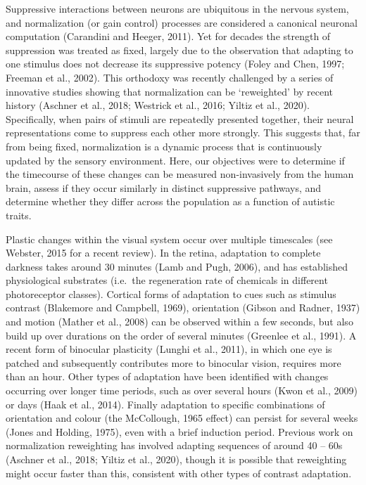 \documentclass[
]{article}
\begin{document}
Suppressive interactions between neurons are ubiquitous in the nervous system, and normalization (or gain control) processes are considered a canonical neuronal computation (Carandini and Heeger, 2011). Yet for decades the strength of suppression was treated as fixed, largely due to the observation that adapting to one stimulus does not decrease its suppressive potency (Foley and Chen, 1997; Freeman et al., 2002). This orthodoxy was recently challenged by a series of innovative studies showing that normalization can be `reweighted' by recent history (Aschner et al., 2018; Westrick et al., 2016; Yiltiz et al., 2020). Specifically, when pairs of stimuli are repeatedly presented together, their neural representations come to suppress each other more strongly. This suggests that, far from being fixed, normalization is a dynamic process that is continuously updated by the sensory environment. Here, our objectives were to determine if the timecourse of these changes can be measured non-invasively from the human brain, assess if they occur similarly in distinct suppressive pathways, and determine whether they differ across the population as a function of autistic traits.

Plastic changes within the visual system occur over multiple timescales (see Webster, 2015 for a recent review). In the retina, adaptation to complete darkness takes around 30 minutes (Lamb and Pugh, 2006), and has established physiological substrates (i.e.~the regeneration rate of chemicals in different photoreceptor classes). Cortical forms of adaptation to cues such as stimulus contrast (Blakemore and Campbell, 1969), orientation (Gibson and Radner, 1937) and motion (Mather et al., 2008) can be observed within a few seconds, but also build up over durations on the order of several minutes (Greenlee et al., 1991). A recent form of binocular plasticity (Lunghi et al., 2011), in which one eye is patched and subsequently contributes more to binocular vision, requires more than an hour. Other types of adaptation have been identified with changes occurring over longer time periods, such as over several hours (Kwon et al., 2009) or days (Haak et al., 2014). Finally adaptation to specific combinations of orientation and colour (the McCollough, 1965 effect) can persist for several weeks (Jones and Holding, 1975), even with a brief induction period. Previous work on normalization reweighting has involved adapting sequences of around 40 -- 60s (Aschner et al., 2018; Yiltiz et al., 2020), though it is possible that reweighting might occur faster than this, consistent with other types of contrast adaptation.
\end{document}
